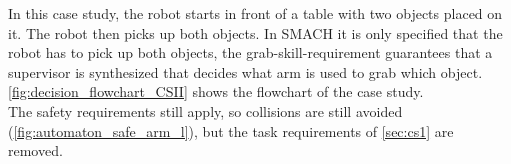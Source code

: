 In this case study, the robot starts in front of a table with two objects placed on it. The robot then picks up both objects.
In SMACH it is only specified that the robot has to pick up both objects, the grab-skill-requirement guarantees that a supervisor is synthesized that decides what arm is used to grab which object.
\cref{fig:decision_flowchart_CSII} shows the flowchart of the case study.\\

The safety requirements still apply, so collisions are still avoided (\cref{fig:automaton_safe_arm_l}), but the task requirements of \cref{sec:cs1} are removed. 


